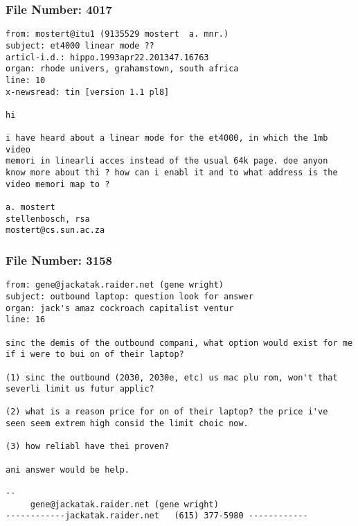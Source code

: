 \subsubsection*{File Number: 4017}
\scriptsize\begin{verbatim}
from: mostert@itu1 (9135529 mostert  a. mnr.)
subject: et4000 linear mode ??
articl-i.d.: hippo.1993apr22.201347.16763
organ: rhode univers, grahamstown, south africa
line: 10
x-newsread: tin [version 1.1 pl8]

hi 

i have heard about a linear mode for the et4000, in which the 1mb video 
memori in linearli acces instead of the usual 64k page. doe anyon
know more about thi ? how can i enabl it and to what address is the
video memori map to ?

a. mostert
stellenbosch, rsa
mostert@cs.sun.ac.za
\end{verbatim}
\subsubsection*{File Number: 3158}
\scriptsize\begin{verbatim}
from: gene@jackatak.raider.net (gene wright)
subject: outbound laptop: question look for answer
organ: jack's amaz cockroach capitalist ventur
line: 16

sinc the demis of the outbound compani, what option would exist for me 
if i were to bui on of their laptop? 

(1) sinc the outbound (2030, 2030e, etc) us mac plu rom, won't that 
severli limit us futur applic?

(2) what is a reason price for on of their laptop? the price i've 
seen seem extrem high consid the limit choic now.

(3) how reliabl have thei proven?

ani answer would be help.

--
     gene@jackatak.raider.net (gene wright)
------------jackatak.raider.net   (615) 377-5980 ------------
\end{verbatim}
